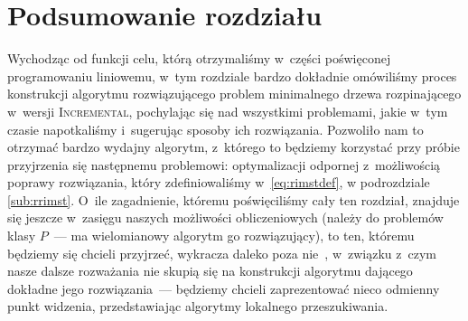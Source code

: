 \section{Podsumowanie rozdziału}




Wychodząc od funkcji celu, którą otrzymaliśmy w~części poświęconej programowaniu liniowemu, w~tym rozdziale bardzo dokładnie omówiliśmy proces konstrukcji algorytmu rozwiązującego problem minimalnego drzewa rozpinającego w~wersji \textsc{Incremental}, pochylając się nad wszystkimi problemami, jakie w~tym czasie napotkaliśmy i~sugerując sposoby ich rozwiązania.
Pozwoliło nam to otrzymać bardzo wydajny algorytm, z~którego to będziemy korzystać przy próbie przyjrzenia się następnemu problemowi: optymalizacji odpornej z~możliwością poprawy rozwiązania, który zdefiniowaliśmy w~\ref{eq:rimstdef}, w podrozdziale \ref{sub:rrimst}.
O~ile zagadnienie, któremu poświęciliśmy cały ten rozdział, znajduje się jeszcze w~zasięgu naszych możliwości obliczeniowych (należy do problemów klasy $P$~--- ma wielomianowy algorytm go rozwiązujący), to ten, któremu będziemy się chcieli przyjrzeć, wykracza daleko poza nie~\cite{DBLP:journals/corr/NasrabadiO13}, w~związku z~czym nasze dalsze rozważania nie skupią się na konstrukcji algorytmu dającego dokładne jego rozwiązania~--- będziemy chcieli zaprezentować nieco odmienny punkt widzenia, przedstawiając algorytmy lokalnego przeszukiwania.